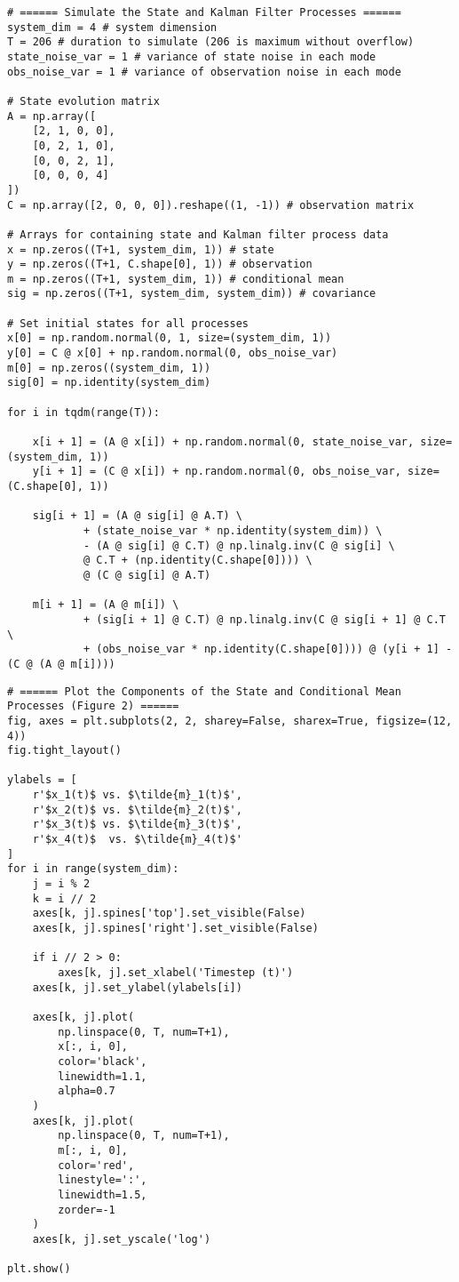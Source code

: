 \documentclass[10pt]{article}
\newcommand{\1}[1]{\mathbbm{1}_{#1}}
\begin{document}
    \begin{verbatim}
# ====== Simulate the State and Kalman Filter Processes ======        
system_dim = 4 # system dimension
T = 206 # duration to simulate (206 is maximum without overflow)
state_noise_var = 1 # variance of state noise in each mode
obs_noise_var = 1 # variance of observation noise in each mode

# State evolution matrix
A = np.array([
    [2, 1, 0, 0],
    [0, 2, 1, 0],
    [0, 0, 2, 1],
    [0, 0, 0, 4]
])
C = np.array([2, 0, 0, 0]).reshape((1, -1)) # observation matrix

# Arrays for containing state and Kalman filter process data
x = np.zeros((T+1, system_dim, 1)) # state
y = np.zeros((T+1, C.shape[0], 1)) # observation
m = np.zeros((T+1, system_dim, 1)) # conditional mean
sig = np.zeros((T+1, system_dim, system_dim)) # covariance

# Set initial states for all processes
x[0] = np.random.normal(0, 1, size=(system_dim, 1))
y[0] = C @ x[0] + np.random.normal(0, obs_noise_var)
m[0] = np.zeros((system_dim, 1))
sig[0] = np.identity(system_dim)

for i in tqdm(range(T)):

    x[i + 1] = (A @ x[i]) + np.random.normal(0, state_noise_var, size=(system_dim, 1))
    y[i + 1] = (C @ x[i]) + np.random.normal(0, obs_noise_var, size=(C.shape[0], 1))

    sig[i + 1] = (A @ sig[i] @ A.T) \
            + (state_noise_var * np.identity(system_dim)) \
            - (A @ sig[i] @ C.T) @ np.linalg.inv(C @ sig[i] \
            @ C.T + (np.identity(C.shape[0]))) \
            @ (C @ sig[i] @ A.T)
    
    m[i + 1] = (A @ m[i]) \
            + (sig[i + 1] @ C.T) @ np.linalg.inv(C @ sig[i + 1] @ C.T \
            + (obs_noise_var * np.identity(C.shape[0]))) @ (y[i + 1] - (C @ (A @ m[i])))
    \end{verbatim}
    \begin{verbatim}
# ====== Plot the Components of the State and Conditional Mean Processes (Figure 2) ======
fig, axes = plt.subplots(2, 2, sharey=False, sharex=True, figsize=(12, 4))
fig.tight_layout()

ylabels = [
    r'$x_1(t)$ vs. $\tilde{m}_1(t)$',
    r'$x_2(t)$ vs. $\tilde{m}_2(t)$',
    r'$x_3(t)$ vs. $\tilde{m}_3(t)$',
    r'$x_4(t)$  vs. $\tilde{m}_4(t)$'
]
for i in range(system_dim):
    j = i % 2
    k = i // 2
    axes[k, j].spines['top'].set_visible(False)
    axes[k, j].spines['right'].set_visible(False)

    if i // 2 > 0:
        axes[k, j].set_xlabel('Timestep (t)')
    axes[k, j].set_ylabel(ylabels[i])

    axes[k, j].plot(
        np.linspace(0, T, num=T+1),
        x[:, i, 0],
        color='black',
        linewidth=1.1,
        alpha=0.7
    )
    axes[k, j].plot(
        np.linspace(0, T, num=T+1),
        m[:, i, 0],
        color='red',
        linestyle=':',
        linewidth=1.5,
        zorder=-1
    )
    axes[k, j].set_yscale('log')

plt.show()
    \end{verbatim}
\end{document}
